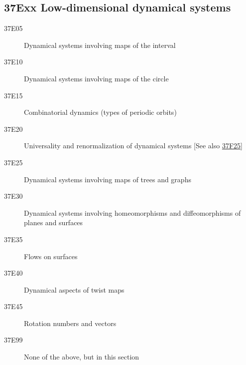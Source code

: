 \subsection*{37Exx  Low-dimensional dynamical systems }\label{37Exx}
\begin{description} 
\item [37E05]\label{37E05} Dynamical systems involving maps of the interval
\item [37E10]\label{37E10} Dynamical systems involving maps of the circle
\item [37E15]\label{37E15} Combinatorial dynamics (types of periodic orbits)
\item [37E20]\label{37E20} Universality and renormalization of dynamical systems [See also \hyperref[37F25]{37F25}]
\item [37E25]\label{37E25} Dynamical systems involving maps of trees and graphs
\item [37E30]\label{37E30} Dynamical systems involving homeomorphisms and diffeomorphisms of planes and surfaces
\item [37E35]\label{37E35} Flows on surfaces
\item [37E40]\label{37E40} Dynamical aspects of twist maps 
\item [37E45]\label{37E45} Rotation numbers and vectors 
\item [37E99]\label{37E99} None of the above, but in this section
\end{description}
